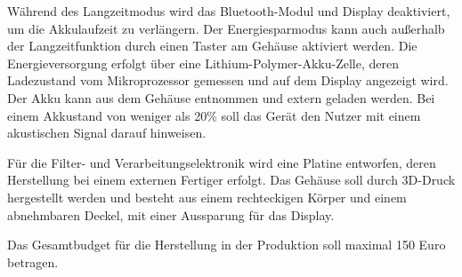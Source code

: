Während des Langzeitmodus wird das Bluetooth-Modul und Display deaktiviert, um die Akkulaufzeit zu verlängern. Der Energiesparmodus kann auch außerhalb der Langzeitfunktion durch einen Taster am Gehäuse aktiviert werden. Die Energieversorgung erfolgt über eine Lithium-Polymer-Akku-Zelle, deren Ladezustand vom Mikroprozessor gemessen und auf dem Display angezeigt wird. Der Akku kann aus dem Gehäuse entnommen und extern geladen werden. Bei einem Akkustand von weniger als 20\% soll das Gerät den Nutzer mit einem akustischen Signal darauf hinweisen. 

Für die Filter- und Verarbeitungselektronik wird eine Platine entworfen, deren Herstellung bei einem externen Fertiger erfolgt. Das Gehäuse soll durch 3D-Druck hergestellt werden und besteht aus einem rechteckigen Körper und einem abnehmbaren Deckel, mit einer Aussparung für das Display.

Das Gesamtbudget für die Herstellung in der Produktion soll maximal 150 Euro betragen. 

